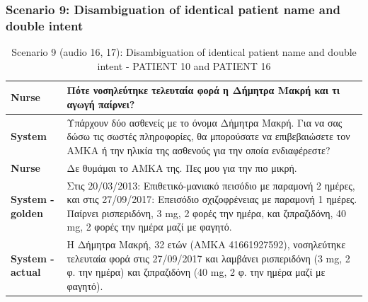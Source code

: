 \subsubsection{Scenario 9: Disambiguation of identical patient name and double intent}
\begin{table}[H]
\centering
\renewcommand{\arraystretch}{1.5} 
\begin{tabular}{|>{\bfseries}l|p{11cm}|}
\hline
Nurse & \textgreek{Πότε νοσηλεύτηκε τελευταία φορά η Δήμητρα Μακρή και τι αγωγή παίρνει?} \\
\hline
System & \textgreek{Υπάρχουν δύο ασθενείς με το όνομα Δήμητρα Μακρή. Για να σας δώσω τις σωστές πληροφορίες, θα μπορούσατε να επιβεβαιώσετε τον ΑΜΚΑ ή την ηλικία της ασθενούς για την οποία ενδιαφέρεστε?} \\
\hline
Nurse & \textgreek{Δε θυμάμαι το ΑΜΚΑ της. Πες μου για την πιο μικρή.} \\
\hline
System - golden &  \textgreek{Στις 20/03/2013: Επιθετικό-μανιακό πεισόδιο με παραμονή 2 ημέρες, και στις 27/09/2017: Επεισόδιο σχιζοφρένειας με παραμονή 1 ημέρες. Παίρνει ρισπεριδόνη, 3 mg, 2 φορές την ημέρα, και ζιπραζιδόνη, 40 mg, 2 φορές την ημέρα μαζί με φαγητό.} \\
\hline
System - actual & \textgreek{Η Δήμητρα Μακρή, 32 ετών (ΑΜΚΑ 41661927592), νοσηλεύτηκε τελευταία φορά στις 27/09/2017 και λαμβάνει ρισπεριδόνη (3 mg, 2 φ. την ημέρα) και ζιπραζιδόνη (40 mg, 2 φ. την ημέρα μαζί με φαγητό).} \\
\hline
\end{tabular}
\caption{Scenario 9 (audio 16, 17): Disambiguation of identical patient name and double intent - PATIENT 10 and PATIENT 16}
\end{table}

